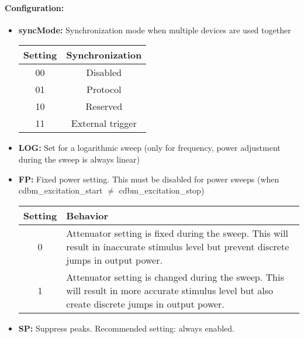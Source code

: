 \documentclass[a4paper,11pt]{article}
\newcommand{\bitrect}[2]{
  \begin{pgfonlayer}{foreground}
    \draw [thick] (0,0) rectangle (#1,1);
    \pgfmathsetmacro\result{#1-1}
    \foreach \x in {1,...,\result}
      \draw [thick] (\x,1) -- (\x, 0.8);
  \end{pgfonlayer}
  \bitlabels{#1}{#2}
}
\newcommand{\rwbits}[3]{
  \draw [thick] (#1,0) rectangle ++(#2,1) node[pos=0.5]{#3};
  \pgfmathsetmacro\start{#1+0.5}
  \pgfmathsetmacro\finish{#1+#2-0.5}
}
\newcommand{\robits}[3]{
  \begin{pgfonlayer}{background}
    \draw [thick, fill=lightgray] (#1,0) rectangle ++(#2,1) node[pos=0.5]{#3};
  \end{pgfonlayer}
  \pgfmathsetmacro\start{#1+0.5}
  \pgfmathsetmacro\finish{#1+#2-0.5}
}
\newcommand{\bitlabels}[2]{
  \foreach \bit in {1,...,#1}{
     \pgfmathsetmacro\result{#2}
     \node [above] at (\bit-0.5, 1) {\pgfmathprintnumber{\result}};
   }
}
\begin{document}
\paragraph{Configuration:}
\begin{center}
\end{center}
\begin{itemize}
\item \textbf{syncMode:} Synchronization mode when multiple devices are used together
\begin{center}
\begin{tabular}{ c|c }
Setting & Synchronization\\
 \hline
00 & Disabled \\
01 & Protocol\\
10 & Reserved\\
11 & External trigger\\
\end{tabular}
\end{center}
\item \textbf{LOG:} Set for a logarithmic sweep (only for frequency, power adjustment during the sweep is always linear)
\item \textbf{FP:} Fixed power setting. This must be disabled for power sweeps (when  cdbm\_excitation\_start $\neq$  cdbm\_excitation\_stop)
\begin{center}
\begin{tabularx}{\textwidth}{ c|X }
Setting & Behavior\\
 \hline
0 & Attenuator setting is fixed during the sweep. This will result in inaccurate stimulus level but prevent discrete jumps in output power. \\
1 & Attenuator setting is changed during the sweep. This will result in more accurate stimulus level but also create discrete jumps in output power. \\
\end{tabularx}
\end{center}
\item \textbf{SP:} Suppress peaks. Recommended setting: always enabled.
\begin{center}
\begin{tabularx}{\textwidth}{ c|X }

\end{tabularx}
\end{center}
\end{itemize}
\end{document}

